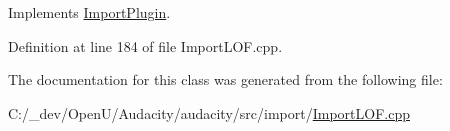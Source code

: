 Implements \hyperlink{class_import_plugin_abe16a65c8e0575fc7dcb0a9531f8f0a7}{Import\+Plugin}.



Definition at line 184 of file Import\+L\+O\+F.\+cpp.



The documentation for this class was generated from the following file\+:\begin{DoxyCompactItemize}
\item 
C\+:/\+\_\+dev/\+Open\+U/\+Audacity/audacity/src/import/\hyperlink{_import_l_o_f_8cpp}{Import\+L\+O\+F.\+cpp}\end{DoxyCompactItemize}
